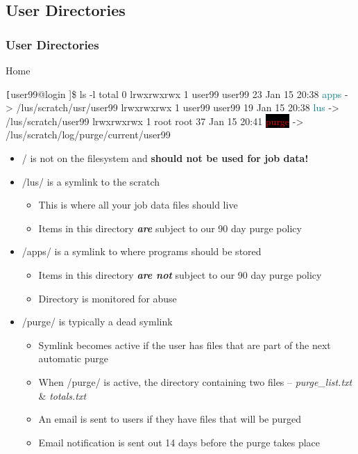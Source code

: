 \subsection{User Directories}
\begin{frame}[fragile]
\frametitle{User Directories}
\begin{block}{Home}
\begin{semiverbatim}\tiny \texttt
[user99@login \ctilde]\$ ls -l 
total 0
lrwxrwxrwx 1 user99 user99 23 Jan 15 20:38 \textcolor{teal}{apps} -> /lus/scratch/usr/user99
lrwxrwxrwx 1 user99 user99 19 Jan 15 20:38 \textcolor{teal}{lus} -> /lus/scratch/user99
lrwxrwxrwx 1 root   root   37 Jan 15 20:41 \colorbox{black}{\textcolor{red}{purge}} -> /lus/scratch/log/purge/current/user99
\end{semiverbatim}
\end{block}
	\begin{itemize}\footnotesize
		\item \ctilde{}/ is not on the {\lustre} filesystem and \textbf{should not be used for job data!}
		\item \ctilde{}/lus/ is a symlink to the {\lustre} scratch
		\begin{itemize}\tiny
			\item This is where all your job data files should live
			\item Items in this directory \emph{\textbf{are}} subject to our 90 day purge policy
		\end{itemize}
		\item \ctilde{}/apps/ is a symlink to where programs should be stored
		\begin{itemize}\tiny
			\item Items in this directory \emph{\textbf{are not}} subject to our 90 day purge policy
			\item Directory is monitored for abuse
		\end{itemize}
		\item \ctilde{}/purge/ is typically a dead symlink
		\begin{itemize}\tiny
			\item Symlink becomes active if the user has files that are part of the next automatic purge
			\item When \ctilde{}/purge/ is active, the directory containing two files -- \emph{purge\_list.txt} \& \emph{totals.txt}
			\item An email is sent to users if they have files that will be purged
			\item Email notification is sent out 14 days before the purge takes place
		\end{itemize}
	\end{itemize}
\end{frame}


